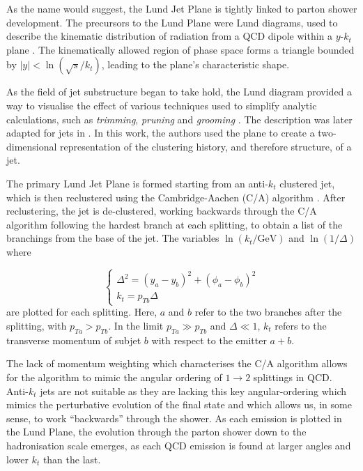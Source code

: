 \documentclass[10pt,a4paper]{book}
\begin{document}
As the name would suggest, the Lund Jet Plane is tightly linked to parton shower development. The precursors to the Lund Plane were Lund diagrams, used to describe the kinematic distribution of radiation from a QCD dipole within a $y$-$k_t$ plane \cite{andersson1989coherence}. The kinematically allowed region of phase space forms a triangle bounded by $\vert y \vert < \ln(\sqrt{s}/k_t)$, leading to the plane's characteristic shape. 

As the field of jet substructure began to take hold, the Lund diagram provided a way to visualise the effect of various techniques used to simplify analytic calculations, such as \emph{trimming}, \emph{pruning} and \emph{grooming} \cite{Dasgupta:2013ihk, Larkoski:2014wba}. The description was later adapted for jets in \cite{Dreyer:2018nbf}. In  this work, the authors used the plane to create a two-dimensional representation of the clustering history, and therefore structure, of a jet.

The primary Lund Jet Plane is formed starting from an anti-$k_t$ clustered jet, which is then reclustered using the Cambridge-Aachen (C/A) algorithm \cite{Atkin:2015msa}. After reclustering, the jet is de-clustered, working backwards through the C/A algorithm following the hardest branch at each splitting, to obtain a list of the branchings from the base of the jet. The variables $\ln(k_t /\text{GeV})$ and $\ln(1/\Delta)$ where

\begin{equation}
\begin{cases}
\Delta^2 = (y_a - y_b)^2 + (\phi_a - \phi_b)^2 \\
k_t = p_{Tb}\Delta 
\end{cases}
\label{delta kt}
\end{equation}
are plotted for each splitting. Here, $a$ and $b$ refer to the two branches after the splitting, with $p_{Ta} > p_{Tb}$. In the limit $p_{Ta} \gg p_{Tb}$ and $\Delta \ll 1$, $k_t$ refers to the transverse momentum of subjet $b$ with respect to the emitter $a+b$.

The lack of momentum weighting which characterises the C/A algorithm allows for the algorithm to mimic the angular ordering of $1 \rightarrow 2$ splittings in QCD. Anti-$k_t$ jets are not suitable as they are lacking this key angular-ordering which mimics the perturbative evolution of the final state and which allows us, in some sense, to work ``backwards'' through the shower. As each emission is plotted in the Lund Plane, the evolution through the parton shower down to the hadronisation scale emerges, as each QCD emission is found at larger angles and lower $k_t$ than the last.
\end{document}
